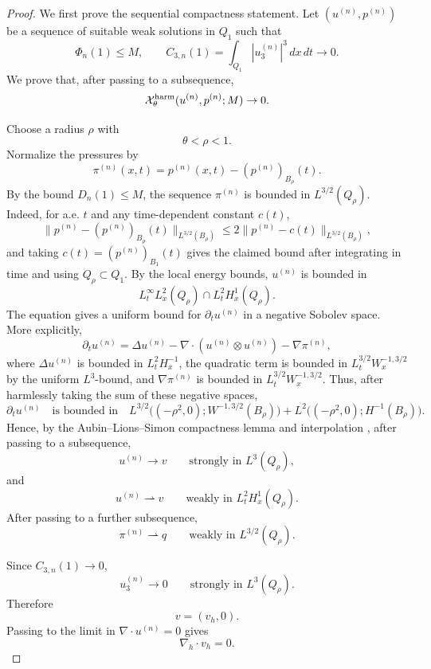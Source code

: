 \documentclass[11pt]{article}
\numberwithin{equation}{section}
\theoremstyle{plain}
\theoremstyle{definition}
\theoremstyle{remark}
\newcommand{\divh}{\nabla_h\!\cdot}
\newcommand{\calX}{\mathcal X}
\begin{document}
\begin{proof}
We first prove the sequential compactness statement.  Let \((u^{(n)},p^{(n)})\) be a sequence of suitable weak solutions in \(Q_1\) such that
\[
        \Phi_n(1)\le M,
        \qquad
        C_{3,n}(1)=\int_{Q_1}|u^{(n)}_3|^3\,dx\,dt\to0 .
\]
We prove that, after passing to a subsequence,
\[
        \calX^{\rm harm}_\theta(u^{(n)},p^{(n)};M)\to0 .
\]

Choose a radius \(\rho\) with
\[
        \theta<\rho<1 .
\]
Normalize the pressures by
\[
        \pi^{(n)}(x,t)
        =p^{(n)}(x,t)-(p^{(n)})_{B_\rho}(t).
\]
By the bound \(D_n(1)\le M\), the sequence \(\pi^{(n)}\) is bounded in \(L^{3/2}(Q_\rho)\).  Indeed, for a.e. \(t\) and any time-dependent constant \(c(t)\),
\[
        \|p^{(n)}-(p^{(n)})_{B_\rho}(t)\|_{L^{3/2}(B_\rho)}
        \le 2\|p^{(n)}-c(t)\|_{L^{3/2}(B_\rho)},
\]
and taking \(c(t)=(p^{(n)})_{B_1}(t)\) gives the claimed bound after integrating in time and using \(Q_\rho\subset Q_1\).  By the local energy bounds, \(u^{(n)}\) is bounded in
\[
        L^\infty_tL^2_x(Q_\rho)
        \cap
        L^2_tH^1_x(Q_\rho).
\]
The equation gives a uniform bound for \(\partial_tu^{(n)}\) in a negative Sobolev space.  More explicitly,
\[
        \partial_tu^{(n)}
        =\Delta u^{(n)}-\nabla\cdot(u^{(n)}\otimes u^{(n)})-\nabla\pi^{(n)},
\]
where \(\Delta u^{(n)}\) is bounded in \(L^2_tH^{-1}_x\), the quadratic term is bounded in \(L^{3/2}_tW^{-1,3/2}_x\) by the uniform \(L^3\)-bound, and \(\nabla\pi^{(n)}\) is bounded in \(L^{3/2}_tW^{-1,3/2}_x\).  Thus, after harmlessly taking the sum of these negative spaces,
\[
        \partial_tu^{(n)}
        \quad\text{is bounded in}\quad
        L^{3/2}\bigl((-\rho^2,0);W^{-1,3/2}(B_\rho)\bigr)+L^2\bigl((-\rho^2,0);H^{-1}(B_\rho)\bigr).
\]
Hence, by the Aubin--Lions--Simon compactness lemma and interpolation \cite{Simon1986}, after passing to a subsequence,
\[
        u^{(n)}\to v
        \qquad\text{strongly in }L^3(Q_\rho),
\]
and
\[
        u^{(n)}\rightharpoonup v
        \qquad\text{weakly in }L^2_tH^1_x(Q_\rho).
\]
After passing to a further subsequence,
\[
        \pi^{(n)}\rightharpoonup q
        \qquad\text{weakly in }L^{3/2}(Q_\rho).
\]

Since \(C_{3,n}(1)\to0\),
\[
        u^{(n)}_3\to0
        \qquad\text{strongly in }L^3(Q_\rho).
\]
Therefore
\[
        v=(v_h,0).
\]
Passing to the limit in \(\nabla\cdot u^{(n)}=0\) gives
\[
        \divh v_h=0.
\]


\end{proof}
\end{document}
